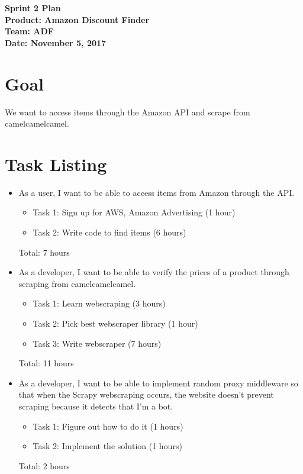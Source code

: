 \documentclass[11pt]{article}
\newcommand\tab[1][1cm]{\hspace*{#1}}
\begin{document}
	\Large{\textbf{Sprint 2 Plan}}\\
	\Large{\textbf{Product: Amazon Discount Finder}}\\
	\Large{\textbf{Team: ADF}}\\
	\Large{\textbf{Date: November 5, 2017}}\\
	
	\vspace{-3mm}
	
	\section{Goal}
		\vspace{-3mm}
		\tab \normalsize{We want to access items through the Amazon API and scrape from camelcamelcamel.}
		

	\section{Task Listing}
		\vspace{-3mm}
		\begin{itemize}
			\item As a user, I want to be able to access items from Amazon through the API.
			\begin{itemize}
			    \item Task 1: Sign up for AWS, Amazon Advertising (1 hour)
			    \item Task 2: Write code to find items (6 hours)
			\end{itemize}
			Total: 7 hours
			\item  As a developer, I want to be able to verify the prices of a product through scraping from camelcamelcamel.
			\begin{itemize}
			    \item Task 1: Learn webscraping (3 hours)
			    \item Task 2: Pick best webscraper library (1 hour)
			    \item Task 3: Write webscraper (7 hours)
			\end{itemize}
			Total: 11 hours
			\item As a developer, I want to be able to implement random proxy middleware so that when the Scrapy webscraping occurs, the website doesn't prevent scraping because it detects that I'm a bot.
			\begin{itemize}
			    \item Task 1: Figure out how to do it (1 hours)
			    \item Task 2: Implement the solution (1 hours)
			\end{itemize}
			 Total: 2 hours
		\end{itemize}
		
\end{document}
